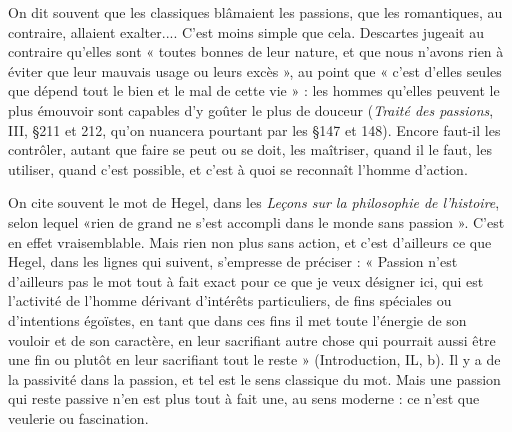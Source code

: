 On dit souvent que les classiques blâmaient les passions, que les romantiques,
au contraire, allaient exalter.... C’est moins simple que cela. Descartes
jugeait au contraire qu’elles sont « toutes bonnes de leur nature, et que nous
n'avons rien à éviter que leur mauvais usage ou leurs excès », au point que
« c’est d’elles seules que dépend tout le bien et le mal de cette vie » : les hommes
qu’elles peuvent le plus émouvoir sont capables d’y goûter le plus de douceur
({\it Traité des passions}, III, \S 211 et 212, qu'on nuancera pourtant par les \S 147 et
148). Encore faut-il les contrôler, autant que faire se peut ou se doit, les maîtriser,
quand il le faut, les utiliser, quand c’est possible, et c’est à quoi se reconnaît
l’homme d’action.

On cite souvent le mot de Hegel, dans les {\it Leçons sur la philosophie de l'histoire},
selon lequel «rien de grand ne s’est accompli dans le monde sans
passion ». C’est en effet vraisemblable. Mais rien non plus sans action, et c’est
d’ailleurs ce que Hegel, dans les lignes qui suivent, s’empresse de préciser :
« Passion n’est d’ailleurs pas le mot tout à fait exact pour ce que je veux désigner
ici, qui est l’activité de l’homme dérivant d’intérêts particuliers, de fins
spéciales ou d’intentions égoïstes, en tant que dans ces fins il met toute
l'énergie de son vouloir et de son caractère, en leur sacrifiant autre chose qui
pourrait aussi être une fin ou plutôt en leur sacrifiant tout le reste » (Introduction,
IL, b). Il y a de la passivité dans la passion, et tel est le sens classique du
mot. Mais une passion qui reste passive n’en est plus tout à fait une, au sens
moderne : ce n’est que veulerie ou fascination.

